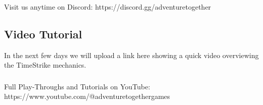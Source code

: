 \documentclass[../main.tex]{subfiles}
\begin{document}
\subsubsection{}
Visit us anytime on Discord: 
https://discord.gg/adventuretogether
\newpage
\subsection{Video Tutorial}
In the next few days we will upload a link here showing a quick video overviewing the TimeStrike mechanics. 

\subsubsection{}
Full Play-Throughs and Tutorials on YouTube: 
https://www.youtube.com/@adventuretogethergames

\clearpage
\end{document}
